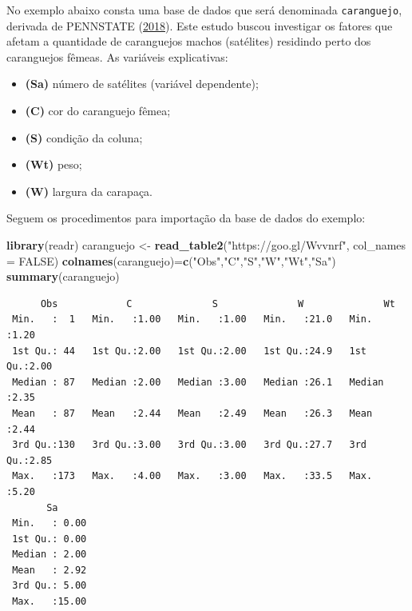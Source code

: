 \documentclass[12pt,brazil,oneside]{book}
\newenvironment{Shaded}{\begin{snugshade}}{\end{snugshade}}
\newcommand{\DataTypeTok}[1]{\textcolor[rgb]{0.13,0.29,0.53}{#1}}
\newcommand{\KeywordTok}[1]{\textcolor[rgb]{0.13,0.29,0.53}{\textbf{#1}}}
\newcommand{\NormalTok}[1]{#1}
\newcommand{\OtherTok}[1]{\textcolor[rgb]{0.56,0.35,0.01}{#1}}
\newcommand{\StringTok}[1]{\textcolor[rgb]{0.31,0.60,0.02}{#1}}
\providecommand{\tightlist}{%
  \setlength{\itemsep}{0pt}\setlength{\parskip}{0pt}}
\begin{document}
No exemplo abaixo consta uma base de dados que será denominada \texttt{caranguejo}, derivada de PENNSTATE (\protect\hyperlink{ref-penn2018}{2018}). Este estudo buscou investigar os fatores que afetam a quantidade de caranguejos machos (satélites) residindo perto dos caranguejos fêmeas. As variáveis explicativas:

\begin{itemize}
\tightlist
\item
  \textbf{(Sa)} número de satélites (variável dependente);
\item
  \textbf{(C)} cor do caranguejo fêmea;
\item
  \textbf{(S)} condição da coluna;
\item
  \textbf{(Wt)} peso;
\item
  \textbf{(W)} largura da carapaça.
\end{itemize}

Seguem os procedimentos para importação da base de dados do exemplo:

\begin{Shaded}
\begin{Highlighting}[]
\KeywordTok{library}\NormalTok{(readr)}
\NormalTok{caranguejo <-}\StringTok{ }\KeywordTok{read_table2}\NormalTok{(}\StringTok{"https://goo.gl/Wvvnrf"}\NormalTok{, }
    \DataTypeTok{col_names =} \OtherTok{FALSE}\NormalTok{)}
\KeywordTok{colnames}\NormalTok{(caranguejo)=}\KeywordTok{c}\NormalTok{(}\StringTok{"Obs"}\NormalTok{,}\StringTok{"C"}\NormalTok{,}\StringTok{"S"}\NormalTok{,}\StringTok{"W"}\NormalTok{,}\StringTok{"Wt"}\NormalTok{,}\StringTok{"Sa"}\NormalTok{)}
\KeywordTok{summary}\NormalTok{(caranguejo)}
\end{Highlighting}
\end{Shaded}

\begin{verbatim}
      Obs            C              S              W              Wt      
 Min.   :  1   Min.   :1.00   Min.   :1.00   Min.   :21.0   Min.   :1.20  
 1st Qu.: 44   1st Qu.:2.00   1st Qu.:2.00   1st Qu.:24.9   1st Qu.:2.00  
 Median : 87   Median :2.00   Median :3.00   Median :26.1   Median :2.35  
 Mean   : 87   Mean   :2.44   Mean   :2.49   Mean   :26.3   Mean   :2.44  
 3rd Qu.:130   3rd Qu.:3.00   3rd Qu.:3.00   3rd Qu.:27.7   3rd Qu.:2.85  
 Max.   :173   Max.   :4.00   Max.   :3.00   Max.   :33.5   Max.   :5.20  
       Sa       
 Min.   : 0.00  
 1st Qu.: 0.00  
 Median : 2.00  
 Mean   : 2.92  
 3rd Qu.: 5.00  
 Max.   :15.00  
\end{verbatim}
\end{document}
